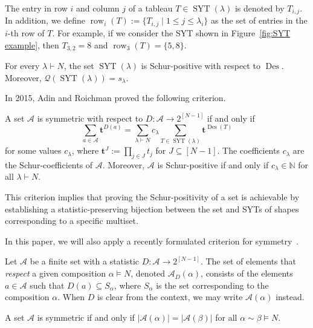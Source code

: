 \documentclass[ALCO]{cedram}
\newcommand{\Des}{\operatorname{Des}}
\newcommand{\Syt}{\operatorname{SYT}}
\newcommand{\row}{\operatorname{row}}
\newcommand{\NN}{\mathbb{N}}
\newcommand{\Q}{\mathcal{Q}}
\newcommand{\A}{\mathcal{A}}
\begin{document}
The entry in row $i$ and column $j$ of a tableau $T \in \Syt(\lambda)$ is denoted by $T_{i,j}$. In addition, we define $\row_i(T) := \{T_{i,j} \mid 1 \le j \le \lambda_i\}$ as the set of entries in the $i$-th row of $T$. For example, if we consider the SYT shown in Figure~\ref{fig:SYT example}, then $T_{3,2} = 8$ and $\row_3(T) = \{5,8\}$.

\begin{theorem}
\label{thm:schur functions young tableaux}
    For every $\lambda \vdash N$, the set $\Syt(\lambda)$ is Schur-positive with respect to $\Des$. Moreover, $\Q(\Syt(\lambda)) = s_\lambda$.
\end{theorem}

In 2015, Adin and Roichman proved the following criterion.
\begin{theorem}
\label{thm:criterion schur positive young}
    A set $\A$ is symmetric with respect to $D:\A\to 2^{[N-1]}$ if and only if
    \[
        \sum_{a \in \A} \boldsymbol{t}^{D(a)} = \sum_{\lambda \vdash N} c_\lambda \sum_{T \in \Syt(\lambda)} \boldsymbol{t}^{\Des(T)}
    \]
    for some values $c_\lambda$, where $\boldsymbol{t}^J := \prod_{j \in J} t_j$ for $J \subseteq [N-1]$. The coefficients $c_\lambda$ are the Schur-coefficients of $\A$. Moreover, $\A$ is Schur-positive if and only if $c_{\lambda} \in \NN$ for all $\lambda \vdash N$.
\end{theorem}

This criterion implies that proving the Schur-positivity of a set is achievable by establishing a statistic-preserving bijection between the set and SYTs of shapes corresponding to a specific multiset.

In this paper, we will also apply a recently formulated criterion for symmetry~\cite{my_pattern_theorem}.
\begin{definition}
\label{def:respect composition}
    Let $\A$ be a finite set with a statistic $D:\A \to 2^{[N-1]}$. The set of elements that \emph{respect} a given composition $\alpha \vDash N$, denoted $\A_D(\alpha)$, consists of the elements $a \in \A$ such that $D(a) \subseteq S_\alpha$, where $S_\alpha$ is the set corresponding to the composition $\alpha$. When $D$ is clear from the context, we may write $\A(\alpha)$ instead.
\end{definition}

\begin{lemma}
\label{lem:my symmetry criterion}
    A set $\A$ is symmetric if and only if $|\A(\alpha)| = |\A(\beta)|$ for all $\alpha \sim \beta \vDash N$.
\end{lemma}
\end{document}
